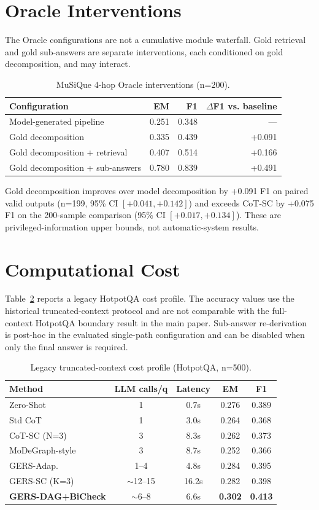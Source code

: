 \documentclass[11pt]{article}
\begin{document}
\section{Oracle Interventions}

The Oracle configurations are not a cumulative module waterfall. Gold retrieval and gold sub-answers are separate interventions, each conditioned on gold decomposition, and may interact.

\begin{table}[h]
\centering
\caption{MuSiQue 4-hop Oracle interventions (n=200).}
\label{tab:oracle}
\small
\begin{tabular}{lrrr}
\toprule
Configuration & EM & F1 & $\Delta$F1 vs. baseline \\
\midrule
Model-generated pipeline & 0.251 & 0.348 & --- \\
Gold decomposition & 0.335 & 0.439 & +0.091 \\
Gold decomposition + retrieval & 0.407 & 0.514 & +0.166 \\
Gold decomposition + sub-answers & 0.780 & 0.839 & +0.491 \\
\bottomrule
\end{tabular}
\end{table}

Gold decomposition improves over model decomposition by +0.091 F1 on paired valid outputs (n=199, 95\% CI $[+0.041,+0.142]$) and exceeds CoT-SC by +0.075 F1 on the 200-sample comparison (95\% CI $[+0.017,+0.134]$). These are privileged-information upper bounds, not automatic-system results.

\section{Computational Cost}

Table~\ref{tab:cost} reports a legacy HotpotQA cost profile. The accuracy values use the historical truncated-context protocol and are not comparable with the full-context HotpotQA boundary result in the main paper. Sub-answer re-derivation is post-hoc in the evaluated single-path configuration and can be disabled when only the final answer is required.

\begin{table}[h]
\centering
\caption{Legacy truncated-context cost profile (HotpotQA, n=500).}
\label{tab:cost}
\small
\begin{tabular}{lcccc}
\toprule
Method & LLM calls/q & Latency & EM & F1 \\
\midrule
Zero-Shot & 1 & 0.7s & 0.276 & 0.389 \\
Std CoT & 1 & 3.0s & 0.264 & 0.368 \\
CoT-SC (N=3) & 3 & 8.3s & 0.262 & 0.373 \\
MoDeGraph-style & 3 & 8.7s & 0.252 & 0.366 \\
GERS-Adap. & 1--4 & 4.8s & 0.284 & 0.395 \\
GERS-SC (K=3) & $\sim$12--15 & 16.2s & 0.282 & 0.398 \\
\textbf{GERS-DAG+BiCheck} & $\sim$6--8 & 6.6s & \textbf{0.302} & \textbf{0.413} \\
\bottomrule
\end{tabular}
\end{table}
\end{document}
